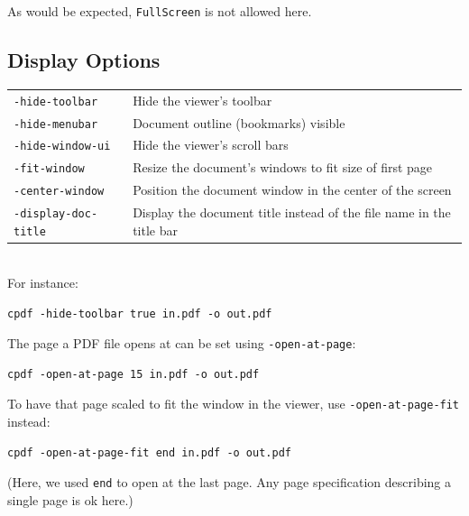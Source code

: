 \documentclass{book}
\begin{document}
  \noindent As would be expected, \texttt{FullScreen} is not allowed here.
  
  \subsection{Display Options}
\vspace{2mm}
  {\small\begin{tabular}{ll}
    \texttt{-hide-toolbar} & \vspace{2mm} \parbox{8cm}{Hide the viewer's toolbar} \\
    \texttt{-hide-menubar} & \vspace{2mm} \parbox{8cm}{Document outline (bookmarks) visible} \\
    \texttt{-hide-window-ui} & \vspace{2mm} \parbox{8cm}{Hide the viewer's scroll bars} \\
    \texttt{-fit-window} & \vspace{2mm} \parbox{8cm}{Resize the document's windows to fit size of first page} \\
    \texttt{-center-window} & \vspace{2mm} \parbox{8cm}{Position the document window in the center of the screen} \\
    \texttt{-display-doc-title} & \vspace{2mm} \parbox{8cm}{Display the document title instead of the file name in the title bar}
  \end{tabular}}\\

  \noindent For instance:
  \begin{framed}
    \noindent\small\verb!cpdf -hide-toolbar true in.pdf -o out.pdf!
  \end{framed}

\noindent The page a PDF file opens at can be set using \texttt{-open-at-page}:
  \begin{framed}
    \noindent\small\verb!cpdf -open-at-page 15 in.pdf -o out.pdf!
  \end{framed}

\noindent To have that page scaled to fit the window in the viewer, use \texttt{-open-at-page-fit} instead:
  \begin{framed}
    \noindent\small\verb!cpdf -open-at-page-fit end in.pdf -o out.pdf!
  \end{framed}

\noindent (Here, we used \texttt{end} to open at the last page. Any page specification describing a single page is ok here.)
\end{document}
